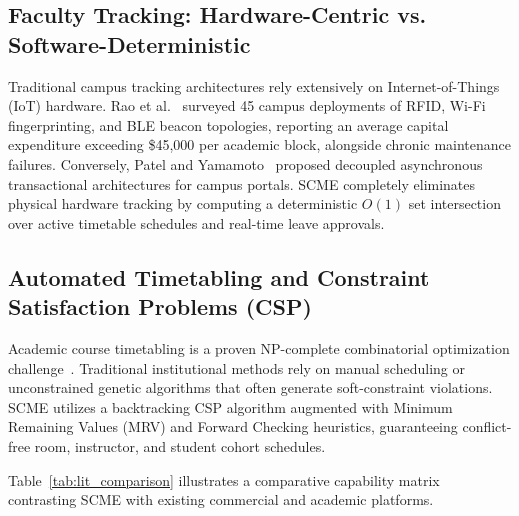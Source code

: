 \documentclass[11pt,a4paper]{article}
\begin{document}
\subsection{Faculty Tracking: Hardware-Centric vs. Software-Deterministic}
Traditional campus tracking architectures rely extensively on Internet-of-Things (IoT) hardware. Rao et al.~\cite{rao2024real} surveyed 45 campus deployments of RFID, Wi-Fi fingerprinting, and BLE beacon topologies, reporting an average capital expenditure exceeding \$45,000 per academic block, alongside chronic maintenance failures. Conversely, Patel and Yamamoto~\cite{patel2025decoupled} proposed decoupled asynchronous transactional architectures for campus portals. SCME completely eliminates physical hardware tracking by computing a deterministic $O(1)$ set intersection over active timetable schedules and real-time leave approvals.

\subsection{Automated Timetabling and Constraint Satisfaction Problems (CSP)}
Academic course timetabling is a proven NP-complete combinatorial optimization challenge~\cite{burke1998simple, russell2020artificial}. Traditional institutional methods rely on manual scheduling or unconstrained genetic algorithms that often generate soft-constraint violations. SCME utilizes a backtracking CSP algorithm augmented with Minimum Remaining Values (MRV) and Forward Checking heuristics, guaranteeing conflict-free room, instructor, and student cohort schedules.

Table~\ref{tab:lit_comparison} illustrates a comparative capability matrix contrasting SCME with existing commercial and academic platforms.
\end{document}
